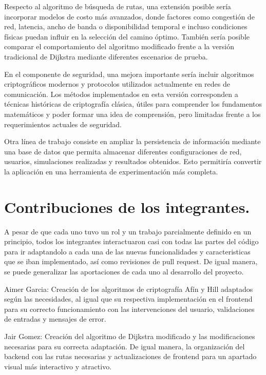 \documentclass[conference]{IEEEtran}
\begin{document}
Respecto al algoritmo de búsqueda de rutas, una extensión posible sería incorporar modelos de costo más avanzados, donde factores como congestión de red, latencia, ancho de banda o disponibilidad temporal e incluso condiciones físicas puedan influir en la selección del camino óptimo. También sería posible comparar el comportamiento del algoritmo modificado frente a la versión tradicional de Dijkstra mediante diferentes escenarios de prueba.

En el componente de seguridad, una mejora importante sería incluir algoritmos criptográficos modernos y protocolos utilizados actualmente en redes de comunicación. Los métodos implementados en esta versión corresponden a técnicas históricas de criptografía clásica, útiles para comprender los fundamentos matemáticos y poder formar una idea de comprensión, pero limitadas frente a los requerimientos actuales de seguridad.

Otra línea de trabajo consiste en ampliar la persistencia de información mediante una base de datos que permita almacenar diferentes configuraciones de red, usuarios, simulaciones realizadas y resultados obtenidos. Esto permitiría convertir la aplicación en una herramienta de experimentación más completa.

\section{Contribuciones de los integrantes.}

A pesar de que cada uno tuvo un rol y un trabajo parcialmente definido en un principio, todos los integrantes interactuaron casi con todas las partes del código para ir adaptandolo a cada una de las nuevas funcionalidades y caracteristicas que se iban implementado, así como revisiones de pull request. De igual manera, se puede generalizar las aportaciones de cada uno al desarrollo del proyecto.

Aimer Garcia: Creación de los algoritmos de criptografía Afín y Hill adaptados según las necesidades, al igual que su respectiva implementación en el frontend para su correcto funcionamiento con las intervenciones del usuario, validaciones de entradas y mensajes de error.

Jair Gomez: Creación del algoritmo de Dijkstra modificado y las modificaciones necesarias para su correcta adaptación. De igual manera, la organización del backend con las rutas necesarias y actualizaciones de frontend para un apartado visual más interactivo y atractivo.
\end{document}
